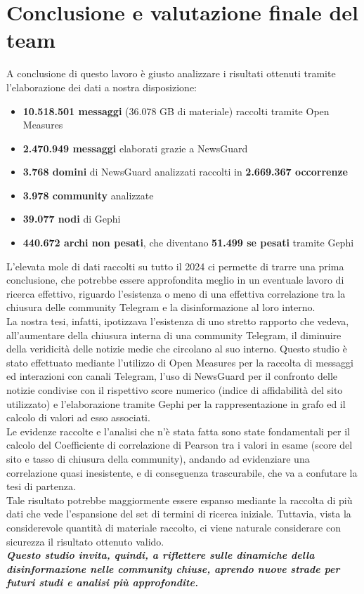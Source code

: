 \documentclass[12pt]{article}
\begin{document}
	\section{Conclusione e valutazione finale del team}
	A conclusione di questo lavoro è giusto analizzare i risultati ottenuti tramite l'elaborazione dei dati a nostra disposizione:\\
	\begin{itemize}[label=]
		\item \textbf{10.518.501 messaggi} (36.078 GB di materiale) raccolti tramite Open Measures
		\item \textbf{2.470.949 messaggi} elaborati grazie a NewsGuard
		\item \textbf{3.768 domini} di NewsGuard analizzati raccolti in \textbf{2.669.367 occorrenze}
		\item \textbf{3.978 community} analizzate
		\item \textbf{39.077 nodi} di Gephi
		\item \textbf{440.672 archi non pesati}, che diventano \textbf{51.499 se pesati} tramite Gephi
	\end{itemize}
	L'elevata mole di dati raccolti su tutto il 2024 ci permette di trarre una prima conclusione, che potrebbe essere approfondita meglio in un eventuale lavoro di ricerca effettivo, riguardo l'esistenza o meno di una effettiva correlazione tra la chiusura delle community Telegram e la disinformazione al loro interno.\\
	La nostra tesi, infatti, ipotizzava l'esistenza di uno stretto rapporto che vedeva, all'aumentare della chiusura interna di una community Telegram, il diminuire della veridicità delle notizie medie che circolano al suo interno.
	Questo studio è stato effettuato mediante l'utilizzo di Open Measures per la raccolta di messaggi ed interazioni con canali Telegram, l'uso di NewsGuard per il confronto delle notizie condivise con il rispettivo score numerico (indice di affidabilità del sito utilizzato) e l'elaborazione tramite Gephi per la rappresentazione in grafo ed il calcolo di valori ad esso associati.\\
	Le evidenze raccolte e l'analisi che n'è stata fatta sono state fondamentali per il calcolo del Coefficiente di correlazione di Pearson tra i valori in esame (score del sito e tasso di chiusura della community), andando ad evidenziare una correlazione quasi inesistente, e di conseguenza trascurabile, che va a confutare la tesi di partenza.\\
	Tale risultato potrebbe maggiormente essere espanso mediante la raccolta di più dati che vede l'espansione del set di termini di ricerca iniziale. Tuttavia, vista la considerevole quantità di materiale raccolto, ci viene naturale considerare con sicurezza il risultato ottenuto valido.\\
	\textbf{\textit{Questo studio invita, quindi, a riflettere sulle dinamiche della disinformazione nelle community chiuse, aprendo nuove strade per futuri studi e analisi più approfondite.}}
	\newpage
\end{document}

